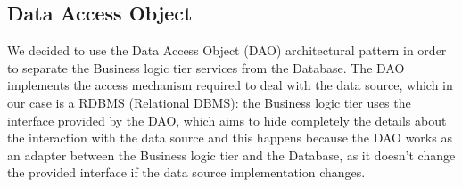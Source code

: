 \documentclass[../../../DD.tex]{subfiles}
\begin{document}
	
	\subsection{Data Access Object\label{subsect:2.6.4}}
	We decided to use the Data Access Object (DAO) architectural pattern in order to separate the Business logic tier services from the Database. The DAO implements the access mechanism required to deal with the data source, which in our case is a RDBMS (Relational DBMS): the Business logic tier uses the interface provided by the DAO, which aims to hide completely the details about the interaction with the data source and this happens because the DAO works as an adapter between the Business logic tier and the Database, as it doesn't change the provided interface if the data source implementation changes.
	
\end{document}

